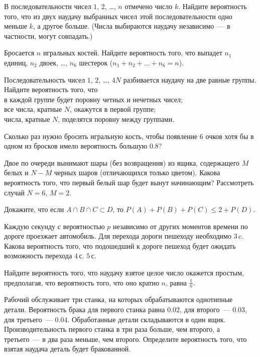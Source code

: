 %
%


\begin{problems}

\item
В последовательности чисел $1$, $2$, \ldots, $n$ отмечено число $k$.
Найдите вероятность того, что из двух наудачу выбранных чисел этой
последовательности одно меньше $k$, а другое больше.
(Числа выбираются наудачу независимо~--- в частности, могут совпадать.)

\item
Бросается $n$ игральных костей.
Найдите вероятность того, что выпадет
$n_1$ единиц, $n_2$ двоек, \ldots, $n_6$ шестерок
($n_1 + n_2 + \ldots + n_6 = n$).

\item
Последовательность чисел $1$, $2$, \ldots, $4N$ разбивается наудачу на две
равные группы.
Найдите вероятность того, что
\\
\sbp в каждой группе будет поровну четных и нечетных чисел;
\\
\sbp все числа, кратные $N$, окажутся в первой группе;
\\
\sbp числа, кратные $N$, поделятся поровну между группами.

\item
Сколько раз нужно бросить игральную кость, чтобы появление $6$ очков хотя бы в
одном из бросков имело вероятность большую $0.8$?

\item
Двое по очереди вынимают шары (без возвращения) из ящика, содержащего
$M$ белых и $N - M$ черных шаров (отличающихся только цветом).
Какова вероятность того, что первый белый шар будет вынут начинающим?
Рассмотреть случай $N = 6$, $M = 2$.

\item
Докажите, что если
$A \cap B \cap C \subset D$,
то
$P(A) + P(B) + P(C) \leq 2 + P(D)$.

\item
Каждую секунду с вероятностью $p$ независимо от других моментов времени по
дороге проезжает автомобиль.
Для перехода дороги пешеходу необходимо $3\,\text{c.}$
Какова вероятность того, что подошедший к дороге пешеход будет ожидать
возможность перехода
\quad
\sbp $4\,\text{с.}$
\quad
\sbp $5\,\text{с.}$

\item
Найдите вероятность того, что наудачу взятое целое число окажется простым,
предполагая, что вероятность того, что оно кратно $n$, равна $\frac{1}{n}$.

\item
Рабочий обслуживает три станка, на которых обрабатываются однотипные детали.
Вероятность брака для первого станка равна $0.02$, для второго~--- $0.03$,
для третьего~--- $0.04$.
Обработанные детали складываются в один ящик.
Производительность первого станка в три раза больше, чем второго, а
третьего~--- в два раза меньше, чем второго.
Определите вероятность того, что взятая наудача деталь будет бракованной.

\end{problems}
